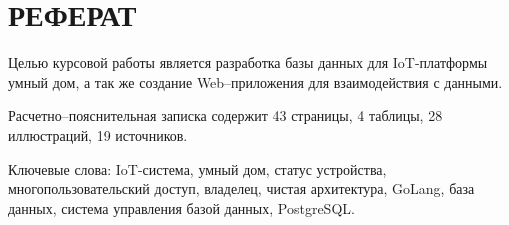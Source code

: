 \chapter*{РЕФЕРАТ}

Целью курсовой работы является разработка базы данных для IoT-платформы умный дом, а так же создание Web–приложения для взаимодействия с данными.

Расчетно–пояснительная записка содержит 43 страницы, 4 таблицы, 28 иллюстраций, 19 источников.

Ключевые слова: IoT-система, умный дом, статус устройства, многопользовательский доступ, владелец, чистая архитектура, GoLang, база данных, система управления базой данных, PostgreSQL.
